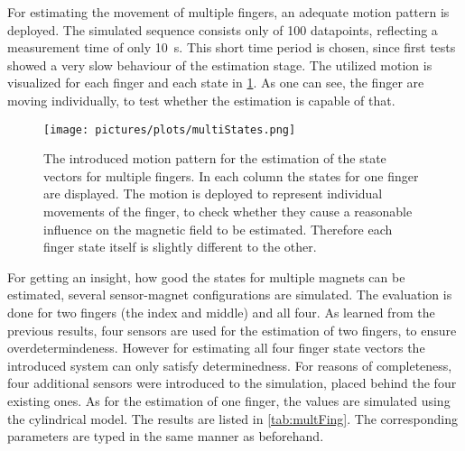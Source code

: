 For estimating the movement of multiple fingers, an adequate motion pattern is deployed. The simulated sequence consists only of 100 datapoints, reflecting a measurement time of only \SI{10}{\second}. This short time period is chosen, since first tests showed a very slow behaviour of the estimation stage. The utilized motion is visualized for each finger and each state in \ref{fig:multiFing}. As one can see, the finger are moving individually, to test whether the estimation is capable of that.
\begin{figure}
\centering
\texttt{[image: pictures/plots/multiStates.png]}
\caption[Introduced movement pattern for four finger estimation]
{The introduced motion pattern for the estimation of the state vectors for multiple fingers. In each column the states for one finger are displayed. The motion is deployed to represent individual movements of the finger, to check whether they cause a reasonable influence on the magnetic field to be estimated. Therefore each finger state itself is slightly different to the other.}
\label{fig:multiFing}
\end{figure}
For getting an insight, how good the states for multiple magnets can be estimated, several sensor-magnet configurations are simulated. The evaluation is done for two fingers (the index and middle) and all four. As learned from the previous results, four sensors are used for the estimation of two fingers, to ensure overdetermindeness. However for estimating all four finger state vectors the introduced system can only satisfy determinedness. For reasons of completeness, four additional sensors were introduced to the simulation, placed behind the four existing ones. As for the estimation of one finger, the values are simulated using the cylindrical model. The results are listed in \ref{tab:multFing}. The corresponding parameters are typed in the same manner as beforehand. 
